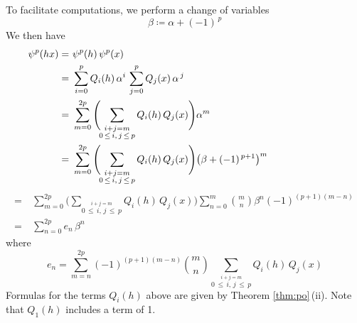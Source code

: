 \documentclass{gtpart}
\theoremstyle{definition}
\theoremstyle{remark}
\newcommand{\A}{\alpha}
\newcommand{\B}{\beta}
\newcommand{\ce}{\coloneqq}
\renewcommand{\=}{\approx}
\renewcommand{\-}{\sim}
\newcommand{\ch}[2]{{#1 \choose #2}}
\numberwithin{equation}{section}
\begin{document}
To facilitate computations, we perform a change of variables 
\[
 \B \ce \A + (-1)^{\,p} 
\]
We then have 
\[
 \begin{split}
  \psi^p(h x) = & ~ \psi^p(h) \, \psi^p(x) \hskip 7.7cm \\
              = & ~ \sum_{i = 0}^p Q_i(h) \, \A^i \, \sum_{j = 0}^p Q_j(x) \, 
                    \A^{\,j} \\
              = & ~ \sum_{m = 0}^{2 p} \Bigg(\!\! 
                    \sum_{\stackrel{\scriptstyle i + j = m}
                    {0 \,\leq\, i, \, j \,\leq\, p}} Q_i(h) \, Q_j(x) \Bigg) 
                    \A^m \\
              = & ~ \sum_{m = 0}^{2 p} \Bigg(\!\! 
                    \sum_{\stackrel{\scriptstyle i + j = m}
                    {0 \,\leq\, i, \, j \,\leq\, p}} Q_i(h) \, Q_j(x) \Bigg) 
                    \big(\B + (-1)^{\,p + 1}\big)^m 
 \end{split}
\]
\[
 \begin{split}
              = & ~ \sum_{m = 0}^{2 p} \Bigg(\!\! 
                    \sum_{\stackrel{\scriptstyle i + j = m}
                    {0 \,\leq\, i, \, j \,\leq\, p}} Q_i(h) \, Q_j(x) \Bigg) 
                    \sum_{n = 0}^m \ch{m}{n} \B^n (-1)^{(p + 1) (m - n)} \, \\
              = & ~ \sum_{n = 0}^{2 p} e_n \, \B^n 
 \end{split}
\]
where 
\[
  e_n = \sum_{m = n}^{2 p} (-1)^{(p + 1) (m - n)} \ch{m}{n} \! 
        \sum_{\stackrel{\scriptstyle i + j = m}{0 \,\leq\, i, \, j \,\leq\, p}} 
        Q_i(h) \, Q_j(x) 
\]
Formulas for the terms $Q_i(h)$ above are given by Theorem \ref{thm:po}\,(ii).  
Note that $Q_1(h)$ includes a term of 1.  
\end{document}
